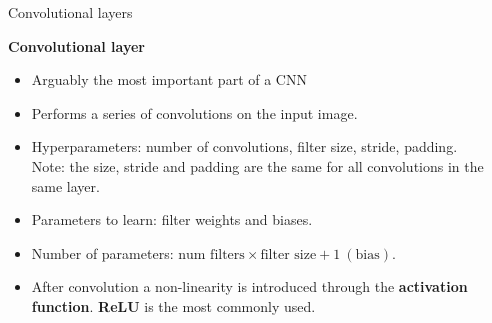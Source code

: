 \documentclass[9pt, aspectratio=169]{beamer}
\begin{document}
\begin{frame}
    {Convolutional layers}

    \textbf{Convolutional layer}

    \begin{itemize}[<+->]
        \item Arguably the most important part of a CNN
        \item Performs a series of convolutions on the input image.
        \item Hyperparameters: number of convolutions, filter size, stride, padding.\\
              Note: the size, stride and padding are the same for all convolutions in the same layer.
        \item Parameters to learn: filter weights and biases.
        \item Number of parameters: $\text{num filters} \times \text{filter size} + 1~(\text{bias}).$
        \item After convolution a non-linearity is introduced through the \textbf{activation function}. \textbf{ReLU} is the most commonly used.
    \end{itemize}

    \centering
\end{frame}
\end{document}
